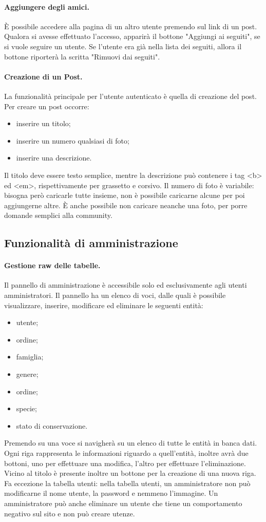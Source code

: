 \documentclass[12pt, a4paper]{article}
\begin{document}
\paragraph{Aggiungere degli amici.} È possibile accedere alla pagina di un altro utente premendo sul link di un post. Qualora si avesse effettuato l'accesso, apparirà il bottone "Aggiungi ai seguiti", se si vuole seguire un utente. Se l'utente era già nella lista dei seguiti, allora il bottone riporterà la scritta "Rimuovi dai seguiti". 
\paragraph{Creazione di un Post.} La funzionalità principale per l'utente autenticato è quella di creazione del post. Per creare un post occorre:
\begin{itemize}
\item inserire un titolo;
\item inserire un numero qualsiasi di foto;
\item inserire una descrizione.
\end{itemize}
Il titolo deve essere testo semplice, mentre la descrizione può contenere i tag <b> ed <em>, rispettivamente per grassetto e corsivo. Il numero di foto è variabile: bisogna però caricarle tutte insieme, non è possibile caricarne alcune per poi aggiungerne altre. È anche possibile non caricare neanche una foto, per porre domande semplici alla community.
\subsection{Funzionalità di amministrazione}
\paragraph{Gestione raw delle tabelle.}
Il pannello di amministrazione è accessibile solo ed esclusivamente agli utenti amministratori. Il pannello ha un elenco di voci, dalle quali è possibile visualizzare, inserire, modificare ed eliminare le seguenti entità:
\begin{itemize}
\item utente;
\item ordine;
\item famiglia;
\item genere;
\item ordine;
\item specie;
\item stato di conservazione.
\end{itemize}
Premendo su una voce si navigherà su un elenco di tutte le entità in banca dati. Ogni riga rappresenta le informazioni riguardo a quell'entità, inoltre avrà due bottoni, uno per effettuare una modifica, l'altro per effettuare l'eliminazione. Vicino al titolo è presente inoltre un bottone per la creazione di una nuova riga. Fa eccezione la tabella utenti: nella tabella utenti, un amministratore non può modificarne il nome utente, la password e nemmeno l'immagine. Un amministratore può anche eliminare un utente che tiene un comportamento negativo sul sito e non può creare utenze.
\end{document}

